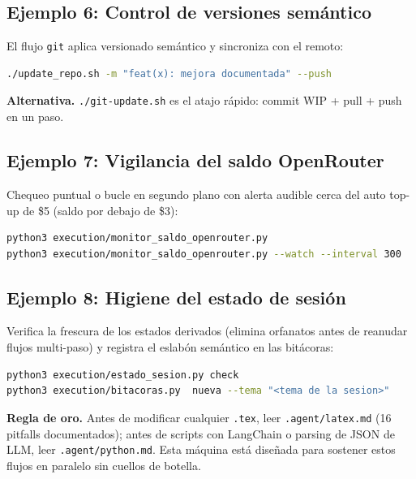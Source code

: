\documentclass[11pt,a4paper]{article}
\begin{document}
\subsection{Ejemplo 6: Control de versiones sem\'antico}
El flujo \texttt{git} aplica versionado sem\'antico y sincroniza con el remoto:

\begin{lstlisting}[language=bash]
./update_repo.sh -m "feat(x): mejora documentada" --push
\end{lstlisting}

\begin{cajaEjemplo}
\textbf{Alternativa.} \texttt{./git-update.sh} es el atajo r\'apido: commit WIP + pull + push en un paso.
\end{cajaEjemplo}

\subsection{Ejemplo 7: Vigilancia del saldo OpenRouter}
Chequeo puntual o bucle en segundo plano con alerta audible cerca del auto top-up
de \$5 (saldo por debajo de \$3):

\begin{lstlisting}[language=bash]
python3 execution/monitor_saldo_openrouter.py
python3 execution/monitor_saldo_openrouter.py --watch --interval 300
\end{lstlisting}

\subsection{Ejemplo 8: Higiene del estado de sesi\'on}
Verifica la frescura de los estados derivados (elimina orfanatos antes de reanudar
flujos multi-paso) y registra el eslab\'on sem\'antico en las bit\'acoras:

\begin{lstlisting}[language=bash]
python3 execution/estado_sesion.py check
python3 execution/bitacoras.py  nueva --tema "<tema de la sesion>"
\end{lstlisting}

\begin{cajaRecuerda}
\textbf{Regla de oro.}
Antes de modificar cualquier \texttt{.tex}, leer \texttt{.agent/latex.md} (16
pitfalls documentados); antes de scripts con LangChain o parsing de JSON de LLM,
leer \texttt{.agent/python.md}. Esta m\'aquina est\'a dise\~nada para sostener
estos flujos en paralelo sin cuellos de botella.
\end{cajaRecuerda}
\end{document}
